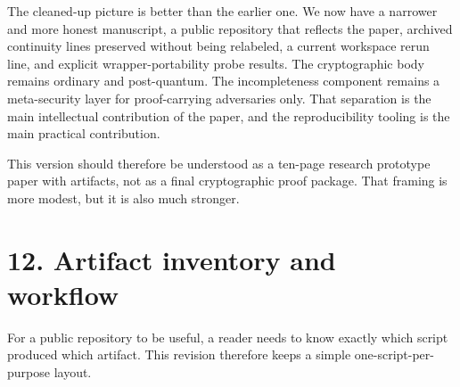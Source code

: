\documentclass[
  11pt,
]{article}
\begin{document}
The cleaned-up picture is better than the earlier one. We now have a
narrower and more honest manuscript, a public repository that reflects
the paper, archived continuity lines preserved without being relabeled,
a current workspace rerun line, and explicit wrapper-portability probe
results. The cryptographic body remains ordinary and post-quantum. The
incompleteness component remains a meta-security layer for
proof-carrying adversaries only. That separation is the main
intellectual contribution of the paper, and the reproducibility tooling
is the main practical contribution.

This version should therefore be understood as a ten-page research
prototype paper with artifacts, not as a final cryptographic proof
package. That framing is more modest, but it is also much stronger.

\section{12. Artifact inventory and
workflow}\label{artifact-inventory-and-workflow}

For a public repository to be useful, a reader needs to know exactly
which script produced which artifact. This revision therefore keeps a
simple one-script-per-purpose layout.
\end{document}

